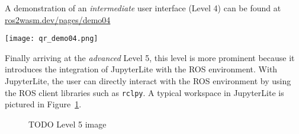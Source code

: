         \begin{tcolorbox}[title=Example 4]
            \begin{minipage}[t]{0.87\linewidth}
                \vspace*{0.5\baselineskip}
                A demonstration of an \textit{intermediate} user interface (Level 4) can
                be found at \href{https://ros2wasm.dev/pages/demo04/index.html}{\textsf{ros2wasm.dev/pages/demo04}}
            \end{minipage}\hfill%
            \begin{minipage}[t]{0.1\linewidth}
                \vspace*{0pt}
                \texttt{[image: qr\_demo04.png]}
            \end{minipage}
        \end{tcolorbox}



        Finally arriving at the \textit{advanced} Level 5, this level is more 
        prominent because it introduces the integration of JupyterLite with the 
        ROS environment. With JupyterLite, the user can directly interact with
        the ROS environment by using the ROS client libraries such as \texttt{rclpy}.
        A typical workspace in JupyterLite is pictured in Figure~\ref{fig:ui5}.

        \begin{figure}[htbp]
            \centering
            \caption{TODO Level 5 image}\label{fig:ui5}
        \end{figure}




